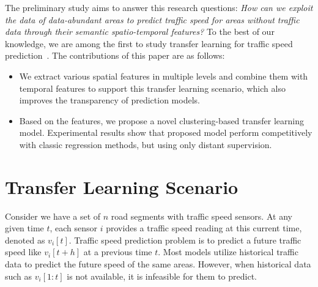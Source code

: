 \documentclass[letterpaper]{article} %
\begin{document}
The preliminary study aims to answer this research questions:
\textit{{{How can we exploit the data of data-abundant areas to predict traffic speed for areas without traffic data through their semantic spatio-temporal features?}}}
To the best of our knowledge, we are among the first to study transfer learning for traffic speed prediction~\cite{xu2016cross}.
The contributions of this paper are as follows: 
\begin{itemize}
	\item We extract various spatial features in multiple levels and combine them with temporal features to support this transfer learning scenario, which also improves the transparency of prediction models. 
	\item Based on the features, we propose a novel clustering-based transfer learning model. Experimental results show that proposed model perform competitively with classic regression methods, but using only distant supervision.
\end{itemize}



\section{Transfer Learning Scenario}
Consider we have a set of $n$ road segments with traffic speed sensors. 
At any given time $t$, 
each sensor $i$ provides a traffic speed reading at this current time, denoted as $v_i[t]$.
Traffic speed prediction problem is to predict a future traffic speed like $v_i[t+h]$ at a previous time $t$. 
Most models utilize historical traffic data to predict the future speed of the same areas. 
However, when historical data such as $v_i[1:t]$ is not available, it is infeasible for them to predict. 
\end{document}
